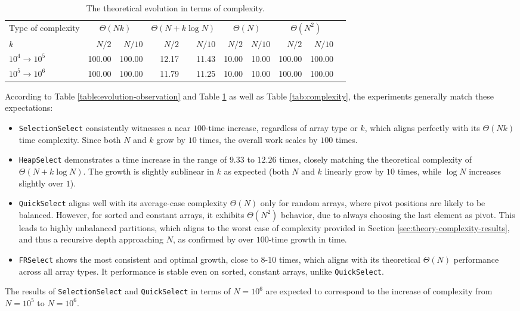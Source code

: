 \documentclass[acmconf,nonacm=true]{acmart}
\begin{document}
\begin{table}[h!]
    \centering
    \footnotesize
    \caption{The theoretical evolution in terms of complexity.}
    \label{table:evolution-theory}
    \begin{tabular}{lrrrrrrrrr}
        \toprule
        {Type of complexity} & \multicolumn{2}{c}{{$\Theta (Nk)$}} & \multicolumn{2}{c}{{$\Theta (N + k \log N)$}} & \multicolumn{2}{c}{{$\Theta (N)$}} & \multicolumn{2}{c}{{$\Theta (N^2)$}} \\
        \cmidrule(r){2-3} \cmidrule(lr){4-5} \cmidrule(lr){6-7} \cmidrule(l){8-9}
        $k$ & $N/2$ & $N/10$ & $N/2$ & $N/10$ & $N/2$ & $N/10$ & $N/2$ & $N/10$ \\
        \midrule
        $10^4 \to 10^5$ & 100.00 & 100.00 & 12.17 & 11.43 & 10.00 & 10.00 & 100.00 & 100.00 \\
        $10^5 \to 10^6$ & 100.00 & 100.00 & 11.79 & 11.25 & 10.00 & 10.00 & 100.00 & 100.00 \\
        \bottomrule
    \end{tabular}
\end{table}

According to Table \ref{table:evolution-observation} and Table \ref{table:evolution-theory} as well as Table \ref{tab:complexity}, the experiments generally match these expectations:

\begin{itemize}
    \item \texttt{SelectionSelect} consistently witnesses a near $100$-time increase, regardless of array type or $k$, which aligns perfectly with its $\Theta(Nk)$ time complexity. Since both $N$ and $k$ grow by $10$ times, the overall work scales by $100$ times.
    \item \texttt{HeapSelect} demonstrates a time increase in the range of $9.33$ to $12.26$ times, closely matching the theoretical complexity of $\Theta (N + k \log N)$. The growth is slightly sublinear in $k$ as expected (both $N$ and $k$ linearly grow by $10$ times, while $\log N$ increases slightly over $1$).
    \item \texttt{QuickSelect} aligns well with its average-case complexity $\Theta (N)$ only for random arrays, where pivot positions are likely to be balanced. However, for sorted and constant arrays, it exhibits $\Theta (N^2)$ behavior, due to always choosing the last element as pivot. This leads to highly unbalanced partitions, which aligns to the worst case of complexity provided in Section \ref{sec:theory-complexity-results}, and thus a recursive depth approaching $N$, as confirmed by over $100$-time growth in time.
    \item \texttt{FRSelect} shows the most consistent and optimal growth, close to 8-10 times, which aligns with its theoretical $\Theta (N)$ performance across all array types. It performance is stable even on sorted, constant arrays, unlike \texttt{QuickSelect}.
\end{itemize}
The results of \texttt{SelectionSelect} and \texttt{QuickSelect} in terms of $N=10^6$ are expected to correspond to the increase of complexity from $N=10^5$ to $N=10^6$.
\end{document}
